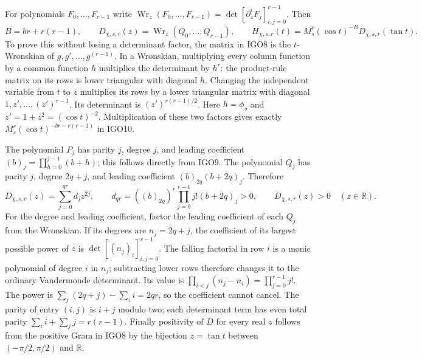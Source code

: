 \documentclass[11pt,a4paper]{article}
\begin{document}
For polynomials $F_0,\ldots,F_{r-1}$ write
$\operatorname{Wr}_z(F_0,\ldots,F_{r-1})
=\det[\partial_z^iF_j]_{i,j=0}^{r-1}$. Then
\[
 B=br+r(r-1),\qquad
 D_{\chi,s,r}(z)=\operatorname{Wr}_z(Q_0,\ldots,Q_{r-1}),
 \qquad
 H_{\chi,s,r}(t)=M_s^r(\cos t)^{-B}D_{\chi,s,r}(\tan t).
 \tag{IGO10}
\]
To prove this without losing a determinant factor, the matrix in
IGO8 is the $t$-Wronskian of $g,g',\ldots,g^{(r-1)}$.
In a Wronskian, multiplying every column function by a common
function $h$ multiplies the determinant by $h^r$:
the product-rule matrix on its rows is lower triangular with
diagonal $h$. Changing the independent variable from $t$ to $z$
multiplies its rows by a lower triangular matrix with diagonal
$1,z',\ldots,(z')^{r-1}$. Its determinant is
$(z')^{r(r-1)/2}$. Here $h=\phi_s$ and
$z'=1+z^2=(\cos t)^{-2}$. Multiplication of these two factors
gives exactly $M_s^r(\cos t)^{-br-r(r-1)}$ in IGO10.

The polynomial $P_j$ has parity $j$, degree $j$, and leading
coefficient $(b)_j=\prod_{h=0}^{j-1}(b+h)$; this follows directly
from IGO9. The polynomial $Q_j$ has parity $j$, degree $2q+j$,
and leading coefficient $(b)_{2q}(b+2q)_j$. Therefore
\[
 D_{\chi,s,r}(z)=\sum_{j=0}^{qr}d_jz^{2j},\qquad
 d_{qr}=((b)_{2q})^r
             \prod_{j=0}^{r-1}j!(b+2q)_j>0,
 \qquad D_{\chi,s,r}(z)>0\quad(z\in\mathbb R).
 \tag{IGO11}
\]
For the degree and leading coefficient, factor the leading
coefficient of each $Q_j$ from the Wronskian. If its degrees are
$n_j=2q+j$, the coefficient of its largest possible power of $z$
is $\det[(n_j)_{\underline i}]_{i,j=0}^{r-1}$.
The falling factorial in row $i$ is a monic polynomial of degree
$i$ in $n_j$; subtracting lower rows therefore changes it to the
ordinary Vandermonde determinant. Its value is
$\prod_{i<j}(n_j-n_i)=\prod_{j=0}^{r-1}j!$.
The power is $\sum_j(2q+j)-\sum_i i=2qr$, so the coefficient
cannot cancel. The parity of entry $(i,j)$ is $i+j$ modulo two;
each determinant term has even total parity
$\sum_i i+\sum_j j=r(r-1)$. Finally positivity of $D$ for
every real $z$ follows from the positive Gram in IGO8 by the
bijection $z=\tan t$ between $(-\pi/2,\pi/2)$ and $\mathbb R$.
\end{document}

